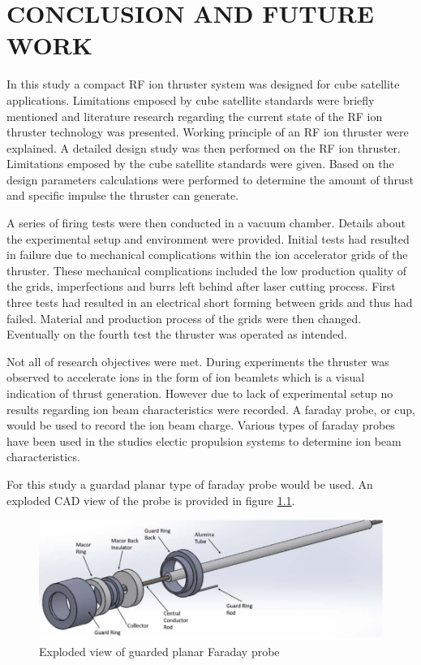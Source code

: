 \chapter{CONCLUSION AND FUTURE WORK}\label{Ch6}

In this study a compact RF ion thruster system was designed for cube satellite applications. Limitations emposed by cube satellite standards were briefly mentioned and literature research regarding the current state of the RF ion thruster technology was presented. Working principle of an RF ion thruster were explained. A detailed design study was then performed on the RF ion thruster. Limitations emposed by the cube satellite standards were given. Based on the design parameters calculations were performed to determine the amount of thrust and specific impulse the thruster can generate. 

A series of firing tests were then conducted in a vacuum chamber. Details about the experimental setup and environment were provided. Initial tests had resulted in failure due to mechanical complications within the ion accelerator grids of the thruster. These mechanical complications included the low production quality of the grids, imperfections and burrs left behind after laser cutting process. First three tests had resulted in an electrical short forming between grids and thus had failed. Material and production process of the grids were then changed. Eventually on the fourth test the thruster was operated as intended. 

Not all of research objectives were met. During experiments the thruster was observed to accelerate ions in the form of ion beamlets which is a visual indication of thrust generation. However due to lack of experimental setup no results regarding ion beam characteristics were recorded. A faraday probe, or cup, would be used to record the ion beam charge. Various types of faraday probes have been used in the studies electic propulsion systems to determine ion beam characteristics.


For this study a guardad planar type of faraday probe would be used. An exploded CAD view of the probe is provided in figure \ref{fig:explodedfaraday}.


\begin{figure}[ht]
    \centering
    \includegraphics[width=\linewidth]{fig/faradayprobeexploded.png}
    \caption[Exploded view of guarded planar Faraday probe]{Exploded view of guarded planar Faraday probe\cite{yildiz2019plume}}
    \label{fig:explodedfaraday}
\end{figure}

